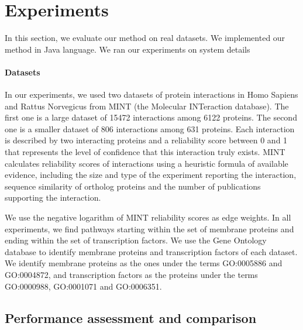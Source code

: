 \documentclass{ws-procs11x85}
\begin{document}
\section{Experiments}

In this section, we evaluate our method on real datasets. We implemented our
method in Java language. We ran our experiments on {\color {red} system details}

\paragraph{Datasets}
In our experiments, we used two datasets of protein interactions
in Homo Sapiens and Rattus Norvegicus from MINT\cite{mint1} (the Molecular
INTeraction database). The first one is a large dataset of 15472 interactions
among 6122 proteins. The second one is a smaller dataset of 806 interactions
among 631 proteins. Each interaction is described by two interacting proteins and a
reliability score between 0 and 1 that represents the level of confidence that
this interaction truly exists. MINT calculates reliability scores of
interactions using a heuristic formula of available evidence, including the
size and type of the experiment reporting the interaction, sequence similarity
of ortholog proteins and the number of publications supporting the
interaction\cite{mint2}. 

We use the negative logarithm of MINT reliability scores as edge weights. In all
experiments, we find pathways starting within the set of membrane proteins and
ending within the set of transcription factors. We use the Gene Ontology
database\cite{go} to identify membrane proteins and transcription factors of each
dataset. We identify membrane proteins as the ones under the terms GO:0005886
and GO:0004872, and transcription factors as the proteins under the terms
GO:0000988, GO:0001071 and GO:0006351.

\subsection{Performance assessment and comparison}
\end{document}
